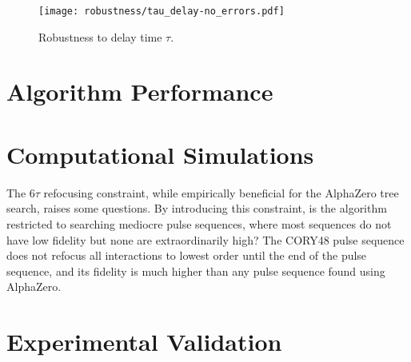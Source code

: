 \begin{figure}[H]
    \centering
    \texttt{[image: robustness/tau\_delay-no\_errors.pdf]}
    \caption{Robustness to delay time $\tau$. %
    }
    \label{fig:tau_delay-no_errors}
\end{figure}











\lipsum[1-2]

\section{Algorithm Performance}



\section{Computational Simulations}





The $6\tau$ refocusing constraint, while empirically beneficial for the AlphaZero tree search, raises some questions. By introducing this constraint, is the algorithm restricted to searching mediocre pulse sequences, where most sequences do not have low fidelity but none are extraordinarily high? The CORY48 pulse sequence does not refocus all interactions to lowest order until the end of the pulse sequence, and its fidelity is much higher than any pulse sequence found using AlphaZero.




\section{Experimental Validation}

